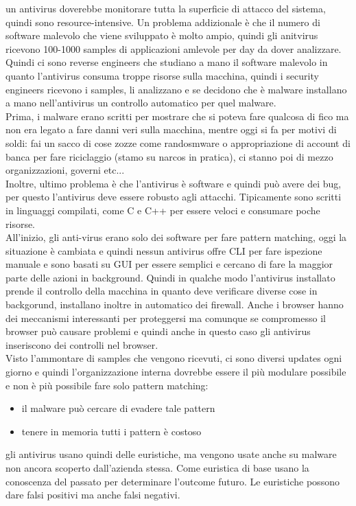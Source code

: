 \documentclass[12pt, oneside]{extbook} %
\begin{document}
un antivirus doverebbe monitorare tutta la superficie di attacco del sistema, quindi sono resource-intensive. Un problema addizionale è che il numero di software malevolo che viene sviluppato è molto ampio, quindi gli anitvirus ricevono 100-1000 samples di applicazioni amlevole per day da dover analizzare. Quindi ci sono reverse engineers che studiano a mano il software malevolo in quanto l'antivirus consuma troppe risorse sulla macchina, quindi i security engineers  ricevono i samples, li analizzano e se decidono che è malware installano a mano nell'antivirus un controllo automatico per quel malware.\\Prima, i malware erano scritti per mostrare che si poteva fare qualcosa di fico ma non era legato a fare danni veri sulla macchina, mentre oggi si fa per motivi di soldi: fai un sacco di cose zozze come randosmware o appropriazione di account di banca per fare riciclaggio (stamo su narcos in pratica), ci stanno poi di mezzo organizzazioni, governi etc...\\Inoltre, ultimo problema è che l'antivirus è software e quindi può avere dei bug, per questo l'antivirus deve essere robusto agli attacchi. Tipicamente sono scritti in linguaggi compilati, come C e C++ per essere veloci e consumare poche risorse.\\All'inizio, gli anti-virus erano solo dei software per fare pattern matching, oggi la situazione è cambiata e quindi nessun antivirus offre CLI per fare ispezione manuale e sono basati su GUI per essere semplici e cercano di fare la maggior parte delle azioni in background. Quindi in qualche modo l'antivirus installato prende il controllo della macchina in quanto deve verificare diverse cose in backgorund, installano inoltre in automatico dei firewall. Anche i browser hanno dei meccanismi interessanti per proteggersi ma comunque se compromesso il browser può causare problemi e quindi anche in questo caso gli antivirus inseriscono dei controlli nel browser.\\ Visto l'ammontare di samples che vengono ricevuti, ci sono diversi updates ogni giorno e quindi l'organizzazione interna dovrebbe essere il più modulare possibile e non è più possibile fare solo pattern matching:
\begin{itemize}
\item il malware può cercare di evadere tale pattern
\item tenere in memoria tutti i pattern è costoso
\end{itemize}
gli antivirus usano quindi delle euristiche, ma vengono usate anche su malware non ancora scoperto dall'azienda stessa. Come euristica di base usano la conoscenza del passato per determinare l'outcome futuro. Le euristiche possono dare falsi positivi ma anche falsi negativi.
\end{document}
